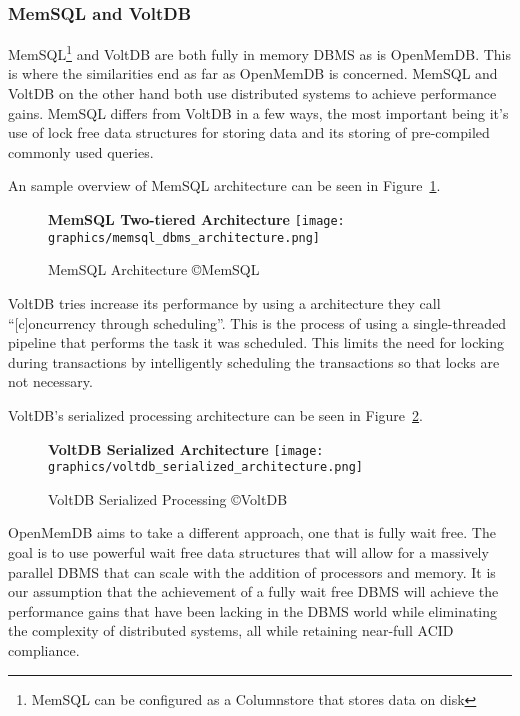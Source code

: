 \documentclass[letterpaper, 11pt]{article}
\begin{document}
\subsubsection{MemSQL and VoltDB}
MemSQL\footnote{MemSQL can be configured as a Columnstore that stores data on disk}
and VoltDB are both fully in memory DBMS as is OpenMemDB. This is where the
similarities end as far as OpenMemDB is concerned. MemSQL and VoltDB on the other
hand both use distributed systems to achieve performance gains. MemSQL differs from
VoltDB in a few ways, the most important being it's use of lock free data structures
for storing data and its storing of pre-compiled commonly used queries\cite{MemSQL}.
\par\vspace{\baselineskip}
An sample overview of MemSQL architecture can be seen in Figure~\ref{fig:memsql_architecture}.
\begin{figure}[H]
  \centering
  \textbf{MemSQL Two-tiered Architecture}
  \texttt{[image: graphics/memsql\_dbms\_architecture.png]}
  \caption{MemSQL Architecture \copyright MemSQL \cite{MemSQL}}
  \label{fig:memsql_architecture}
\end{figure}

VoltDB tries increase its performance by using a architecture they call \\ ``[c]oncurrency through
scheduling''\cite{VoltDB}. This is the process of using a single-threaded pipeline
that performs the task it was scheduled. This limits the need for locking during
transactions by intelligently scheduling the transactions so that locks are not
necessary.
\par\vspace{\baselineskip}
VoltDB's serialized processing architecture can be seen in Figure~\ref{fig:voltdb_serialized}.
\begin{figure}[H]
  \centering
  \textbf{VoltDB Serialized Architecture}
  \texttt{[image: graphics/voltdb\_serialized\_architecture.png]}
  \caption{VoltDB Serialized Processing \copyright VoltDB \cite{VoltDB}}
  \label{fig:voltdb_serialized}
\end{figure}

OpenMemDB aims to take a different approach, one that is fully wait free. The goal is
to use powerful wait free data structures that will allow for a massively parallel
DBMS that can scale with the addition of processors and memory. It is our assumption
that the achievement of a fully wait free DBMS will achieve the performance gains
that have been lacking in the DBMS world while eliminating the complexity of
distributed systems, all while retaining near-full ACID compliance.
\par\vspace{\baselineskip}
\end{document}
